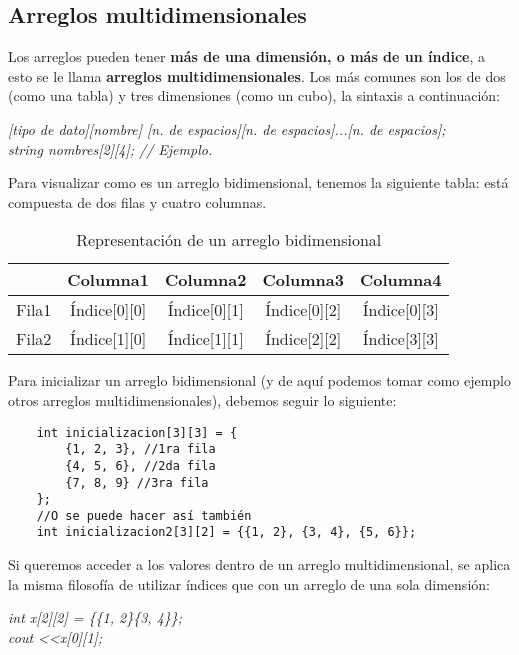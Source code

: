\subsection{Arreglos multidimensionales}
\hspace{0.55cm}Los arreglos pueden tener \textbf{más de una dimensión, o más de un índice}, a esto se le llama \textbf{arreglos multidimensionales}. Los más comunes son los de dos (como una tabla) y tres dimensiones (como un cubo), la sintaxis a continuación:
\begin{center}
    \textit{
        [tipo de dato][nombre] [n. de espacios][n. de espacios]...[n. de espacios];\\
        string nombres[2][4]; // Ejemplo.
    }
\end{center}

Para visualizar como es un arreglo bidimensional, tenemos la siguiente tabla: está compuesta de dos filas y cuatro columnas.
\begin{table}[H]
    \begin{center}
        \caption{Representación de un arreglo bidimensional}
        \label{tab: 5}
        \begin{tabular}{|c|c|c|c|c|}
            \hline
            &\textbf{Columna1}&\textbf{Columna2}&\textbf{Columna3}&\textbf{Columna4} \\
            \hline
            Fila1   & Índice[0][0]   & Índice[0][1]   & Índice[0][2]   & Índice[0][3] \\
            \hline
            Fila2   & Índice[1][0]   & Índice[1][1]   & Índice[2][2]   & Índice[3][3] \\
            \hline
        \end{tabular}
    \end{center}
\end{table}

Para inicializar un arreglo bidimensional (y de aquí podemos tomar como ejemplo otros arreglos multidimensionales), debemos seguir lo siguiente:
\begin{lstlisting}
    int inicializacion[3][3] = {
        {1, 2, 3}, //1ra fila
        {4, 5, 6}, //2da fila
        {7, 8, 9} //3ra fila
    };
    //O se puede hacer así también
    int inicializacion2[3][2] = {{1, 2}, {3, 4}, {5, 6}};
\end{lstlisting}

Si queremos acceder a los valores dentro de un arreglo multidimensional, se aplica la misma filosofía de utilizar índices que con un arreglo de una sola dimensión:
\begin{center}
    \textit{
        int x[2][2] = \{\{1, 2\}\{3, 4\}\}; \\
        cout \textless\textless x[0][1];
    }
\end{center}



